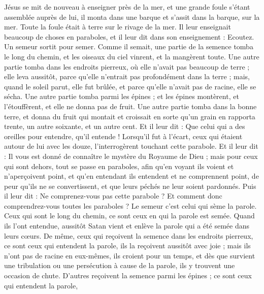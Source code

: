 \begin{multicols}{2}
\VerseOne{}Jésus se mit de nouveau à enseigner près de la mer, et une grande foule s’étant assemblée auprès de lui, il monta dans une barque et s’assit dans la barque, sur la mer. Toute la foule était à terre sur le rivage de la mer.
Il leur enseignait beaucoup de choses en paraboles, et il leur dit dans son enseignement :
Ecoutez. Un semeur sortit pour semer.
Comme il semait, une partie de la semence tomba le long du chemin, et les oiseaux du ciel vinrent, et la mangèrent toute.
Une autre partie tomba dans les endroits pierreux, où elle n'avait pas beaucoup de terre ; elle leva aussitôt, parce qu'elle n'entrait pas profondément dans la terre ;
mais, quand le soleil parut, elle fut brûlée, et parce qu'elle n'avait pas de racine, elle se sécha.
Une autre partie tomba parmi les épines ; et les épines montèrent, et l'étouffèrent, et elle ne donna pas de fruit.
Une autre partie tomba dans la bonne terre, et donna du fruit qui montait et croissait en sorte qu'un grain en rapporta trente, un autre soixante, et un autre cent.
Et il leur dit : Que celui qui a des oreilles pour entendre, qu'il entende !
Lorsqu’il fut à l’écart, ceux qui étaient autour de lui avec les douze, l'interrogèrent touchant cette parabole.
Et il leur dit : Il vous est donné de connaître le mystère du Royaume de Dieu ; mais pour ceux qui sont dehors, tout se passe en paraboles,
afin qu'en voyant ils voient et n'aperçoivent point, et qu'en entendant ils entendent et ne comprennent point, de peur qu'ils ne se convertissent, et que leurs péchés ne leur soient pardonnés.
Puis il leur dit : Ne comprenez-vous pas cette parabole ? Et comment donc comprendrez-vous toutes les paraboles ?
Le semeur c'est celui qui sème la parole.
Ceux qui sont le long du chemin, ce sont ceux en qui la parole est semée. Quand ils l’ont entendue, aussitôt Satan vient et enlève la parole qui a été semée dans leurs cœurs.
De même, ceux qui reçoivent la semence dans les endroits pierreux, ce sont ceux qui entendent la parole, ils la reçoivent aussitôt avec joie ;
mais ils n'ont pas de racine en eux-mêmes, ils croient pour un temps, et dès que survient une tribulation ou une persécution à cause de la parole, ils y trouvent une occasion de chute.
D’autres reçoivent la semence parmi les épines ; ce sont ceux qui entendent la parole,

\end{multicols}
